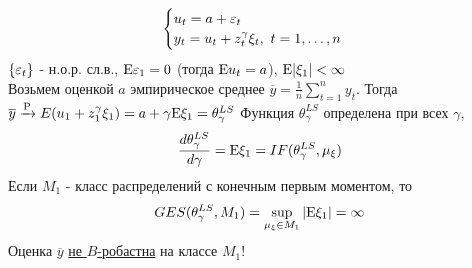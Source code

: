 \begin{example}
    \[\begin{cases}
        u_t = a + \varepsilon_t \\
        y_t = u_t + z^\gamma_t\xi_t, \ t=1,\ldots,n
    \end{cases}\]
    $\{\varepsilon_t\}$ - н.о.р. сл.в., $\mathrm{E}\varepsilon_1=0$ (тогда $\mathrm{E} u_t=a$), $\mathrm{E}\vert\xi_1\vert<\infty$ \\
    Возьмем оценкой $a$ эмпирическое среднее $\overline{y}=\frac{1}{n}\sum_{t=1}^ny_t$.
    Тогда $\overline{y}\xrightarrow{\mathrm{P}}E(u_1+z_1^\gamma\xi_1)=a+\gamma\mathrm{E}\xi_1=\theta^{LS}_\gamma$
    Функция $\theta_\gamma^{LS}$ определена при всех $\gamma$,
    \[\frac{d\theta_\gamma^{LS}}{d\gamma}=\mathrm{E}\xi_1=IF(\theta_\gamma^{LS}, \mu_\xi)\]
    Если $M_1$ - класс распределений с конечным первым моментом, то
    \[GES(\theta_\gamma^{LS}, M_1) = \sup_{\mu_\xi\in M_1} \vert\mathrm{E}\xi_1\vert = \infty\]
    Оценка $\overline{y}$ \underline{не $B$-робастна} на  классе $M_1$!
\end{example}
